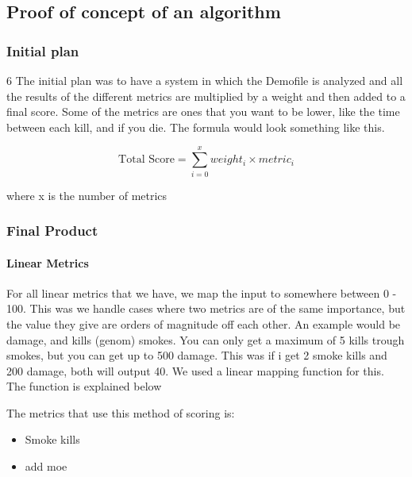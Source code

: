 \subsection{Proof of concept of an algorithm}

\subsubsection{Initial plan}6
The initial plan was to have a system in which the \Gls{Demofile} is analyzed and all the results of the different metrics are multiplied by a weight and then added to a final score. Some of the metrics are ones that you want to be lower, like the time between each kill, and if you die. The formula would look something like this.

$$\text{Total Score} = \sum_{i=0}^{x} weight_i \times metric_i $$

where x is the number of metrics
\subsubsection{Final Product}

\paragraph{Linear Metrics}
For all linear metrics that we have, we map the input to somewhere between 0 - 100. This was we handle cases where two metrics are of the same importance, but the value they give are orders of magnitude off each other. An example would be damage, and kills (genom) smokes. You can only get a maximum of 5 kills trough smokes, but you can get up to 500 damage. This was if i get 2 smoke kills and 200 damage, both will output 40. We used a linear mapping function for this. The function is explained below

The metrics that use this method of scoring is:
\begin{itemize}
    \item Smoke kills
    \item add moe 
\end{itemize}

